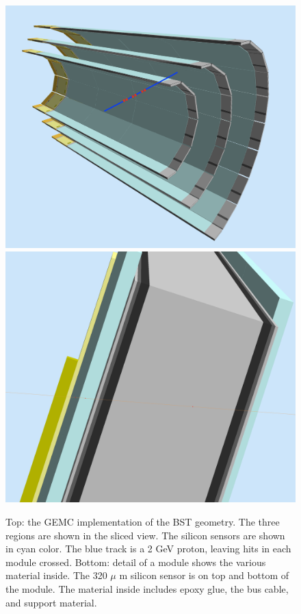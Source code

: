 \begin{figure}
	\centering
	\includegraphics[width=0.95\columnwidth,keepaspectratio]{img/bstGeometry.png}
	\includegraphics[width=0.95\columnwidth,keepaspectratio]{img/bstDetail.png}
	\caption{Top: the GEMC implementation of the BST geometry. The three regions are shown in the sliced view. The silicon sensors are shown
           in cyan color. The blue track is a 2 GeV proton, leaving hits in each module crossed. Bottom: detail of a module shows
           the various material inside. The 320 $\mu$ m silicon sensor is on top and bottom of the module.
           The material inside includes epoxy glue, the bus cable, and support material. }
	\label{fig:bstGeometry}
\end{figure}


